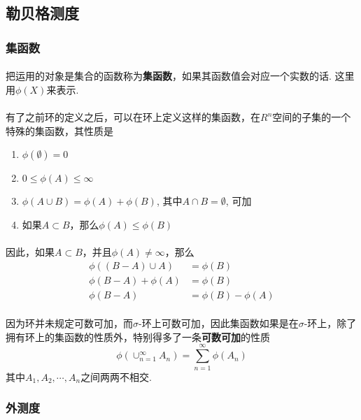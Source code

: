 \subsection{勒贝格测度}

\subsubsection{集函数}
\paragraph{}
把运用的对象是集合的函数称为\textbf{集函数}，如果其函数值会对应一个实数的话. 这里用$\phi(X)$来表示. 

\paragraph{}
有了之前环的定义之后，可以在环上定义这样的集函数，在$R^n$空间的子集的一个特殊的集函数，其性质是
\begin{enumerate}
\item $\phi(\emptyset) = 0$
\item $0 \leq \phi(A) \leq \infty$
\item $\phi(A \cup B) = \phi(A) + \phi(B)$, 其中$A \cap B = \emptyset$, 可加
\item 如果$A \subset B$，那么$\phi(A) \leq \phi(B)$
\end{enumerate}

\paragraph{}
因此，如果$A \subset B$，并且$\phi(A) \neq \infty$，那么
\begin{align*}
\phi( (B - A) \cup A) &= \phi(B) \\
\phi(B - A) + \phi(A) &=  \phi(B) \\
\phi(B - A) &= \phi(B) - \phi(A)
\end{align*}


\paragraph{}
因为环并未规定可数可加，而$\sigma$-环上可数可加，因此集函数如果是在$\sigma$-环上，除了拥有环上的集函数的性质外，特别得多了一条\textbf{可数可加}的性质
$$
\phi(\cup_{n=1}^\infty A_n) = \sum_{n=1}^\infty \phi(A_n)
$$
其中$A_1, A_2, \cdots, A_n$之间两两不相交. 

\subsubsection{外测度}
